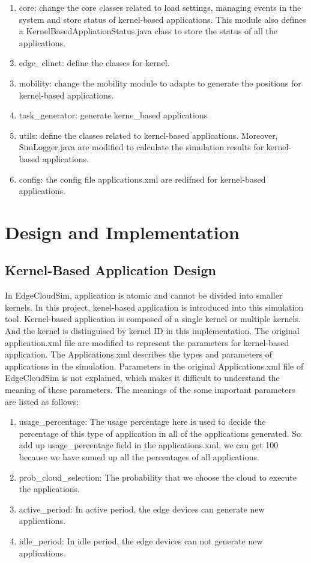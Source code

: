 \begin{enumerate}
	\item core: change the core classes related to load settings, managing events in the system and store status of kernel-based applications. This module also defines a KernelBasedAppliationStatus.java class to store the status of all the applications.
	\item edge\_clinet: define the classes for kernel.
	\item mobility: change the mobility module to adapte to generate the positions for kernel-based applications.
	\item task\_generator: generate kerne\_based applications
	\item utils: define the classes related to kernel-based applications. Moreover, SimLogger.java are modified to calculate the simulation results for kernel-based applications.
	\item config: the config file applications.xml are redifned for kernel-based applications.
\end{enumerate}


\section{Design and Implementation}

\subsection{Kernel-Based Application Design}
In EdgeCloudSim, application is atomic and cannot be divided into smaller kernels. In this project, kenel-based application is introduced into this simulation tool. Kernel-based application is composed of a single kernel or multiple kernels. And the kernel is distinguised by kernel ID in this implementation. The original application.xml file are modified to represent the parameters for kernel-based application. The Applications.xml describes the types and parameters of applications in the simulation. Parameters in the original Applications.xml file of EdgeCloudSim is not explained, which makes it difficult to understand the meaning of these parameters.  The meanings of the some important parameters are listed as follows:

\begin{enumerate}
	\item usage\_percentage: The usage percentage here is used to decide the percentage of this type of application in all of the applications generated. So add up usage\_percentage field in the applications.xml, we can get 100 because we have sumed up all the percentages of all applications.
	\item prob\_cloud\_selection: The probability that we choose the cloud to execute the applications.
	\item active\_period: In active period, the edge devices can generate new applications.
	\item idle\_period: In idle period, the edge devices can not generate new applications.
\end{enumerate}

